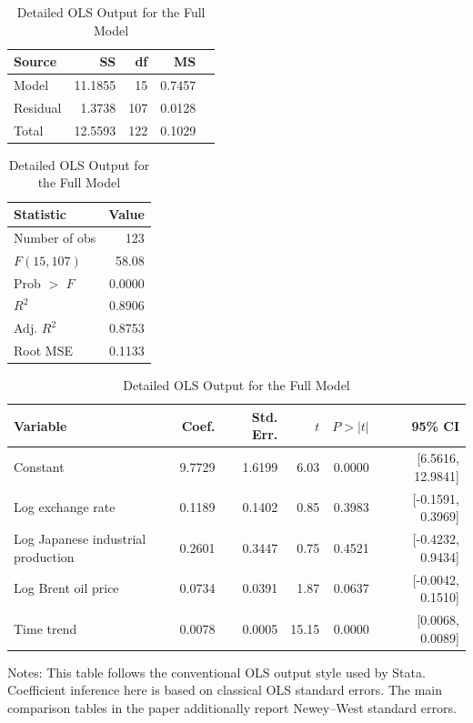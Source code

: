 \begin{table}[H]
\centering
\caption{Detailed OLS Output for the Full Model}
\label{tab:statafull}
\begin{minipage}{0.48\textwidth}
\centering
\begin{tabular}{lrrrr}
\toprule
Source & SS & df & MS & \\
\midrule
Model & 11.1855 & 15 & 0.7457 & \\
Residual & 1.3738 & 107 & 0.0128 & \\
Total & 12.5593 & 122 & 0.1029 & \\
\bottomrule
\end{tabular}
\end{minipage}
\hfill
\begin{minipage}{0.44\textwidth}
\centering
\begin{tabular}{lr}
\toprule
Statistic & Value \\
\midrule
Number of obs & 123 \\
$F(15,107)$ & 58.08 \\
Prob $>$ $F$ & 0.0000 \\
$R^2$ & 0.8906 \\
Adj. $R^2$ & 0.8753 \\
Root MSE & 0.1133 \\
\bottomrule
\end{tabular}
\end{minipage}
\vspace{0.8em}
\begin{tabular}{lrrrrr}
\toprule
Variable & Coef. & Std. Err. & $t$ & $P>|t|$ & 95\% CI \\
\midrule
Constant & 9.7729 & 1.6199 & 6.03 & 0.0000 & [6.5616, 12.9841] \\
Log exchange rate & 0.1189 & 0.1402 & 0.85 & 0.3983 & [-0.1591, 0.3969] \\
Log Japanese industrial production & 0.2601 & 0.3447 & 0.75 & 0.4521 & [-0.4232, 0.9434] \\
Log Brent oil price & 0.0734 & 0.0391 & 1.87 & 0.0637 & [-0.0042, 0.1510] \\
Time trend & 0.0078 & 0.0005 & 15.15 & 0.0000 & [0.0068, 0.0089] \\
\bottomrule
\end{tabular}
\begin{minipage}{0.95\textwidth}
\vspace{0.4em}\footnotesize Notes: This table follows the conventional OLS output style used by Stata. Coefficient inference here is based on classical OLS standard errors. The main comparison tables in the paper additionally report Newey--West standard errors.
\end{minipage}
\end{table}
